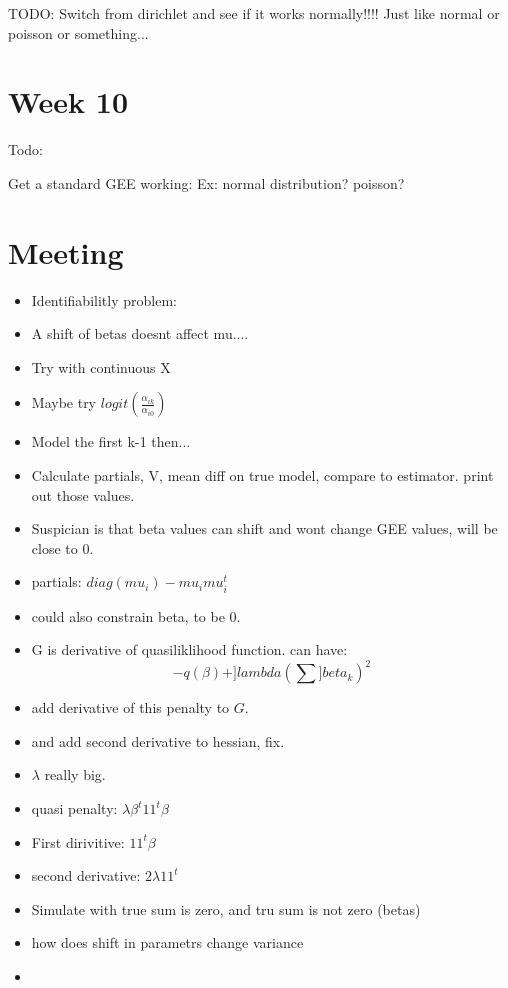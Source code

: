 \documentclass[10pt]{article}
\theoremstyle{definition}
\begin{document}
TODO: Switch from dirichlet and see if it works normally!!!! Just like normal or poisson or something...



\section{Week 10}

Todo:

Get a standard GEE working:
Ex: normal distribution? poisson?

\section{Meeting}

\begin{itemize}
  \item Identifiabilitly problem:
  \item A shift of betas doesnt affect mu....
  \item Try with continuous X
  \item Maybe try $logit(\frac{\alpha_{ik}}{\alpha_{i0}})$
  \item Model the first k-1 then...
  \item Calculate partials, V, mean diff on true model, compare to estimator. print out those values.
  \item Suspician is that beta values can shift and wont change GEE values, will be close to 0.
  \item partials: $diag(mu_i) - mu_i mu_i^t$
  \item could also constrain beta, to be 0.
  \item G is derivative of quasiliklihood function. can have:
  \[-q(\beta) + ]lambda (\sum ]beta_k)^2 \]
  \item add derivative of this penalty to $G$.
  \item and add second derivative to hessian, fix.
  \item $\lambda$ really big.
  \item quasi penalty: $\lambda \beta^t 1 1^t \beta$
  \item First dirivitive: $11^t \beta$
  \item second derivative: $2\lambda 1 1^t$
  \item Simulate with true sum is zero, and tru sum is not zero (betas)
  \item how does shift in parametrs change variance
  \item
\end{itemize}
\end{document}
